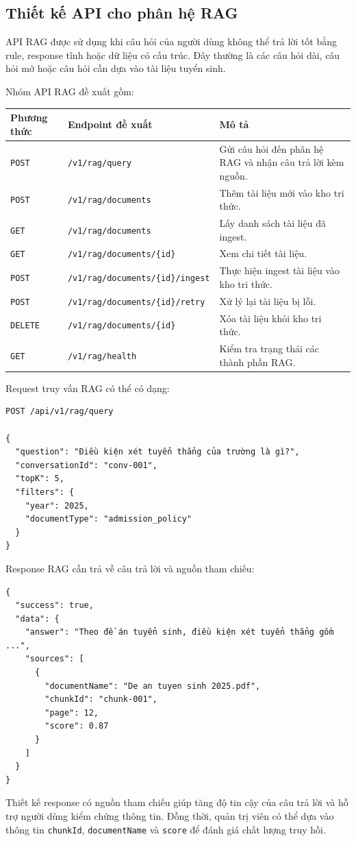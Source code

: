 \subsection{Thiết kế API cho phân hệ RAG}

API RAG được sử dụng khi câu hỏi của người dùng không thể trả lời tốt bằng rule, response tĩnh hoặc dữ liệu có cấu trúc. Đây thường là các câu hỏi dài, câu hỏi mở hoặc câu hỏi cần dựa vào tài liệu tuyển sinh.

Nhóm API RAG đề xuất gồm:

\begin{longtable}{|p{3cm}|p{5cm}|p{7cm}|}
\hline
\textbf{Phương thức} & \textbf{Endpoint đề xuất} & \textbf{Mô tả} \\
\hline
\texttt{POST} & \texttt{/v1/rag/query} & Gửi câu hỏi đến phân hệ RAG và nhận câu trả lời kèm nguồn. \\
\hline
\texttt{POST} & \texttt{/v1/rag/documents} & Thêm tài liệu mới vào kho tri thức. \\
\hline
\texttt{GET} & \texttt{/v1/rag/documents} & Lấy danh sách tài liệu đã ingest. \\
\hline
\texttt{GET} & \texttt{/v1/rag/documents/\{id\}} & Xem chi tiết tài liệu. \\
\hline
\texttt{POST} & \texttt{/v1/rag/documents/\{id\}/ingest} & Thực hiện ingest tài liệu vào kho tri thức. \\
\hline
\texttt{POST} & \texttt{/v1/rag/documents/\{id\}/retry} & Xử lý lại tài liệu bị lỗi. \\
\hline
\texttt{DELETE} & \texttt{/v1/rag/documents/\{id\}} & Xóa tài liệu khỏi kho tri thức. \\
\hline
\texttt{GET} & \texttt{/v1/rag/health} & Kiểm tra trạng thái các thành phần RAG. \\
\hline
\end{longtable}

Request truy vấn RAG có thể có dạng:

\begin{verbatim}
POST /api/v1/rag/query

{
  "question": "Điều kiện xét tuyển thẳng của trường là gì?",
  "conversationId": "conv-001",
  "topK": 5,
  "filters": {
    "year": 2025,
    "documentType": "admission_policy"
  }
}
\end{verbatim}

Response RAG cần trả về câu trả lời và nguồn tham chiếu:

\begin{verbatim}
{
  "success": true,
  "data": {
    "answer": "Theo đề án tuyển sinh, điều kiện xét tuyển thẳng gồm ...",
    "sources": [
      {
        "documentName": "De an tuyen sinh 2025.pdf",
        "chunkId": "chunk-001",
        "page": 12,
        "score": 0.87
      }
    ]
  }
}
\end{verbatim}

Thiết kế response có nguồn tham chiếu giúp tăng độ tin cậy của câu trả lời và hỗ trợ người dùng kiểm chứng thông tin. Đồng thời, quản trị viên có thể dựa vào thông tin \texttt{chunkId}, \texttt{documentName} và \texttt{score} để đánh giá chất lượng truy hồi.
